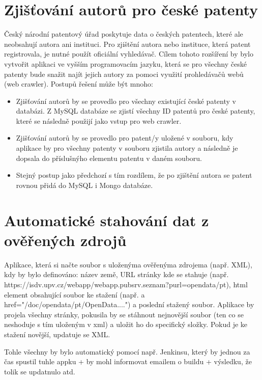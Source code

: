 \section{Zjišťování autorů pro české patenty}
Český národní patentový úřad poskytuje data o českých patentech, které ale neobsahují autora ani instituci. Pro zjištění autora nebo instituce, která patent registrovala, je nutné použít oficiální vyhledávač. Cílem tohoto rozšíření by bylo vytvořit aplikaci ve vyšším programovacím jazyku, která se pro všechny české patenty bude snažit najít jejich autory za pomoci využití prohledávačů webů (web crawler). Postupů řešení může být mnoho:
\begin{itemize}
\item Zjišťování autorů by se provedlo pro všechny existující české patenty v databázi. Z MySQL databáze se zjistí všechny ID patentů pro české patenty, které se následně použijí jako vstup pro web crawler.
\item Zjišťování autorů by se provedlo pro patent/y uložené v souboru, kdy aplikace by pro všechny patenty v souboru zjistila autory a následně je dopsala do příslušnýho elementu patentu v daném souboru.
\item Stejný postup jako předchozí s tím rozdílem, že po zjištění autora se patent rovnou přidá do MySQL i Mongo databáze.
\end{itemize}

\section{Automatické stahování dat z ověřených zdrojů}
Aplikace, která si načte soubor s uloženýma ověřenýma zdrojema (např. XML), kdy by bylo definováno: název země, URL stránky kde se stahuje (např. https://isdv.upv.cz/webapp/webapp.pubsrv.seznam?purl=opendata/pt), html element obsahující soubor ke stažení (např. a href="/doc/opendata/pt/OpenData....") a poslední stažený soubor. Aplikace by projela všechny stránky, pokusila by se stáhnout nejnovější soubor (ten co se neshoduje s tím uloženým v xml) a uložit ho do specifický složky. Pokud je ke stažení novější, updatuje se XML.

Tohle všechny by bylo automatický pomocí např. Jenkinsu, který by jednou za čas spustil tuhle appku + by mohl informovat emailem o buildu + výsledku, že tolik se updatnulo atd.

